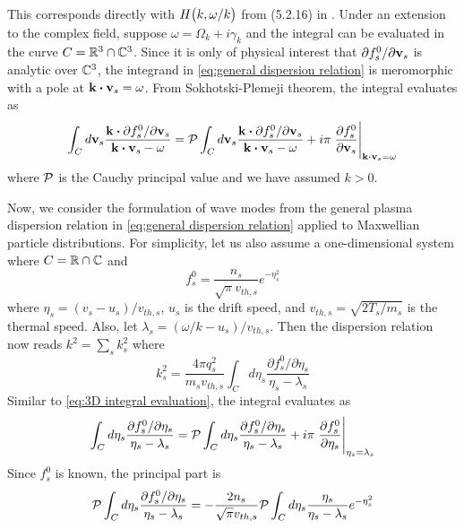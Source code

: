 This corresponds directly with $H\qty(k,\omega/k)$ from (5.2.16) in
\cite{Benz1993}. Under an extension to the complex field, suppose
$\omega=\Omega_k+i\gamma_k$ and the integral can be evaluated in the curve
$C=\mathbb{R}^3\cap\mathbb{C}^3$. Since it is only of physical interest that
$\partial f_s^0/\partial\vb{v}_s$ is analytic over $\mathbb{C}^3$, the integrand in
\cref{eq:general dispersion relation} is meromorphic with a pole at
$\vb{k}\vdot\vb{v}_s=\omega$. From Sokhotski-Plemeji theorem, the integral
evaluates as
\begin{equation}\label{eq:3D integral evaluation}
    \int_Cd\vb{v}_s
        \frac{\vb{k}\vdot\partial f_s^0/\partial\vb{v}_s}
        {\vb{k}\vdot\vb{v}_s-\omega}
        =\pval\int_Cd\vb{v}_s\frac{\vb{k}\vdot\partial f_s^0/\partial\vb{v}_s}
            {\vb{k}\vdot\vb{v}_s-\omega}
            +i\pi\Eval{\frac{\partial f_s^0}{\partial\vb{v}_s}}
                {\vb{k}\vdot\vb{v}_s=\omega}{}
\end{equation}
where $\mathcal{P}$ is the Cauchy principal value and we have assumed $k>0$.

Now, we consider the formulation of wave modes from the general plasma
dispersion relation in \cref{eq:general dispersion relation} applied to
Maxwellian particle distributions. For simplicity, let us also assume a
one-dimensional system where $C=\mathbb{R}\cap\mathbb{C}$ and
\begin{equation}\label{eq:maxwellian distribution}
    f_s^0=\frac{n_s}{\sqrt\pi v_{th,s}}e^{-\eta_s^2}
\end{equation}
where $\eta_s=(v_s-u_s)/v_{th,s}$, $u_s$ is the drift speed, and
$v_{th,s}=\sqrt{2T_s/m_s}$ is the thermal speed. Also, let
$\lambda_s=(\omega/k-u_s)/v_{th,s}$. Then the dispersion relation now reads
$k^2=\sum_sk_s^2$ where
\begin{equation}\label{eq:dispersion relation contributions}
    k_s^2=\frac{4\pi q_s^2}{m_sv_{th,s}}
        \int_Cd\eta_s\frac{\partial f_s^0/\partial\eta_s}{\eta_s-\lambda_s}
\end{equation}
Similar to \cref{eq:3D integral evaluation}, the integral evaluates as
\begin{equation}
    \int_Cd\eta_s\frac{\partial f_s^0/\partial\eta_s}{\eta_s-\lambda_s}
    =\mathcal{P}\int_Cd\eta_s\frac{\partial f_s^0/\partial\eta_s}{\eta_s-\lambda_s}
    +i\pi\left.\frac{\partial f_s^0}{\partial\eta_s}\right\rvert_{\eta_s=\lambda_s}^{}
\end{equation}
Since $f_s^0$ is known, the principal part is
\begin{equation}\label{eq:1D_integral_evaluation}
    \mathcal{P}\int_Cd\eta_s\frac{\partial f_s^0/\partial\eta_s}{\eta_s-\lambda_s}
    =-\frac{2n_s}{\sqrt\pi v_{th,s}}
        \mathcal{P}\int_Cd\eta_s\frac{\eta_s}{\eta_s-\lambda_s}e^{-\eta_s^2}
\end{equation}

